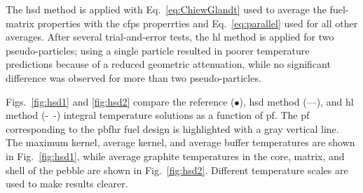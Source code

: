 The \gls{hsd} method is applied with Eq.\ \eqref{eq:ChiewGlandt} used to average the fuel-matrix properties with the \glspl{cfp} properrties and Eq.\ \eqref{eq:parallel} used for all other averages. After several trial-and-error tests, the \gls{hl} method is applied for two pseudo-particles; using a single particle resulted in poorer temperature predictions because of a reduced geometric attenuation, while no significant difference was observed for more than two pseudo-particles.

Figs.\ \ref{fig:hsd1} and \ref{fig:hsd2} compare the reference ($\bullet$), \gls{hsd} method (---), and \gls{hl} method \mbox{(- -)} integral temperature solutions as a function of \gls{pf}. The \gls{pf} corresponding to the \gls{pbfhr} fuel design is highlighted with a gray vertical line. The maximum kernel, average kernel, and average buffer temperatures are shown in Fig.\ \ref{fig:hsd1}, while average graphite temperatures in the core, matrix, and shell of the pebble are shown in Fig.\ \ref{fig:hsd2}. Different temperature scales are used to make results clearer.

